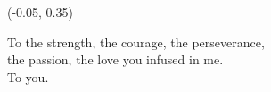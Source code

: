 \thispagestyle{empty}

\setlength{\TPHorizModule}{\textwidth}
\setlength{\TPVertModule}{\textwidth}

\begin{textblock}{1}(-0.05, 0.35)
    \begin{flushright}
        \begin{em}

            To the strength, the courage, the perseverance, \\
            the passion, the love you infused in me. \\
            To you.


        \end{em}
    \end{flushright}
    
\end{textblock}

\clearpage{\pagestyle{empty}\cleardoublepage}